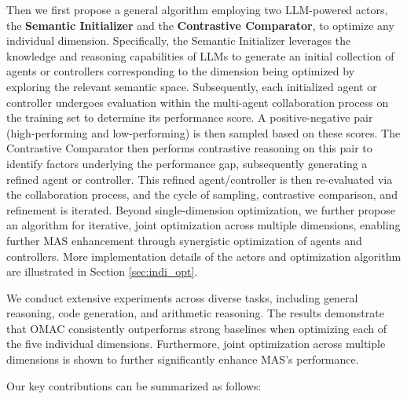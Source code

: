 Then we first propose a general algorithm employing two LLM-powered actors, the \textbf{Semantic Initializer} and the \textbf{Contrastive Comparator}, to optimize any individual dimension. Specifically, the Semantic Initializer leverages the knowledge and reasoning capabilities of LLMs to generate an initial collection of agents or controllers corresponding to the dimension being optimized by exploring the relevant semantic space. Subsequently, each initialized agent or controller undergoes evaluation within the multi-agent collaboration process on the training set to determine its performance score. 
A positive-negative pair (high-performing and low-performing) is then sampled based on these scores. 
The Contrastive Comparator then performs contrastive reasoning on this pair to identify factors underlying the performance gap, subsequently generating a refined agent or controller. This refined agent/controller is then re-evaluated via the collaboration process, and the cycle of sampling, contrastive comparison, and refinement is iterated. Beyond single-dimension optimization, we further propose an algorithm for iterative, joint optimization across multiple dimensions, enabling further MAS enhancement through synergistic optimization of agents and controllers. More implementation details of the actors and optimization algorithm are illustrated in Section \ref{sec:indi_opt}.



We conduct extensive experiments across diverse tasks, including general reasoning, code generation, and arithmetic reasoning. The results demonstrate that OMAC consistently outperforms strong baselines when optimizing each of the five individual dimensions. Furthermore, joint optimization across multiple dimensions is shown to further significantly enhance MAS's performance.




Our key contributions can be summarized as follows:

